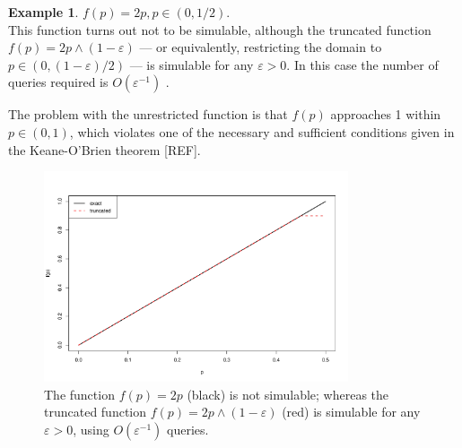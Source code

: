 \documentclass{article}
\theoremstyle{definition}
\newtheorem{example}{Example}
\begin{document}
\begin{example}\label{ex:2p}
$f(p) = 2p, p\in(0,1/2)$.\\
This function turns out not to be simulable, although the truncated function $f(p) = 2p \wedge (1-\varepsilon)$ --- or equivalently, restricting the domain to $p\in(0,(1 - \varepsilon)/2)$ --- is simulable for any $\varepsilon>0$. In this case the number of queries required is $O(\varepsilon ^{-1})$ \citep{huber2016}.

The problem with the unrestricted function is that $f(p)$ approaches 1 within $p\in(0,1)$, which violates one of the necessary and sufficient conditions given in the Keane-O'Brien theorem [REF].
\begin{figure}
\centering
\includegraphics[width=0.8\textwidth]{2p_truncation.pdf}
\caption{The function $f(p)=2p$ (black) is not simulable; whereas the truncated function $f(p)=2p\wedge (1-\varepsilon)$ (red) is simulable for any $\varepsilon>0$, using $O(\varepsilon^{-1})$ queries.}
\label{fig:2p_truncation}
\end{figure}
\end{example}
\end{document}
